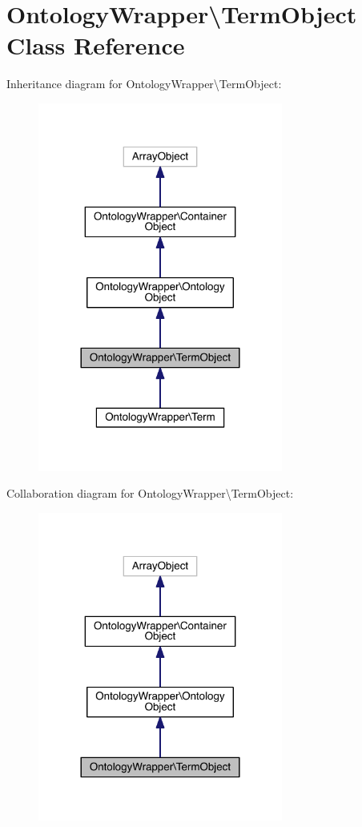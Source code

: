 \hypertarget{class_ontology_wrapper_1_1_term_object}{\section{Ontology\-Wrapper\textbackslash{}Term\-Object Class Reference}
\label{class_ontology_wrapper_1_1_term_object}
}


Inheritance diagram for Ontology\-Wrapper\textbackslash{}Term\-Object\-:\nopagebreak
\begin{figure}[H]
\begin{center}
\leavevmode
\includegraphics[width=228pt]{class_ontology_wrapper_1_1_term_object__inherit__graph}
\end{center}
\end{figure}


Collaboration diagram for Ontology\-Wrapper\textbackslash{}Term\-Object\-:\nopagebreak
\begin{figure}[H]
\begin{center}
\leavevmode
\includegraphics[width=228pt]{class_ontology_wrapper_1_1_term_object__coll__graph}
\end{center}
\end{figure}
